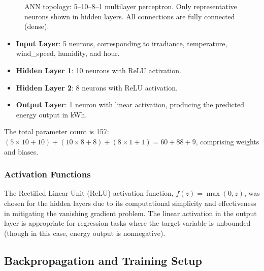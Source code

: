\documentclass[11pt, a4paper]{article}
\begin{document}
\begin{figure}[H]
\begin{tcolorbox}[colback=lightgray, colframe=rulecolor, boxrule=0.5pt, arc=4mm, auto outer arc, width=0.98\textwidth, halign=center]
    \end{tcolorbox}
    \caption{ANN topology: 5--10--8--1 multilayer perceptron. Only representative
    neurons shown in hidden layers. All connections are fully connected (dense).}
    \label{fig:topology}
\end{figure}

\begin{itemize}
    \item \textbf{Input Layer}: 5 neurons, corresponding to irradiance,
    temperature, wind\_speed, humidity, and hour.
    \item \textbf{Hidden Layer 1}: 10 neurons with ReLU activation.
    \item \textbf{Hidden Layer 2}: 8 neurons with ReLU activation.
    \item \textbf{Output Layer}: 1 neuron with linear activation, producing the
    predicted energy output in kWh.
\end{itemize}

The total parameter count is 157: $(5 \times 10 + 10) + (10 \times 8 + 8) +
(8 \times 1 + 1) = 60 + 88 + 9$, comprising weights and biases.

\subsubsection{Activation Functions}

The Rectified Linear Unit (ReLU) activation function, $f(z) = \max(0, z)$,
was chosen for the hidden layers due to its computational simplicity and
effectiveness in mitigating the vanishing gradient problem. The linear
activation in the output layer is appropriate for regression tasks where the
target variable is unbounded (though in this case, energy output is
nonnegative).

\subsection{Backpropagation and Training Setup}
\end{document}
